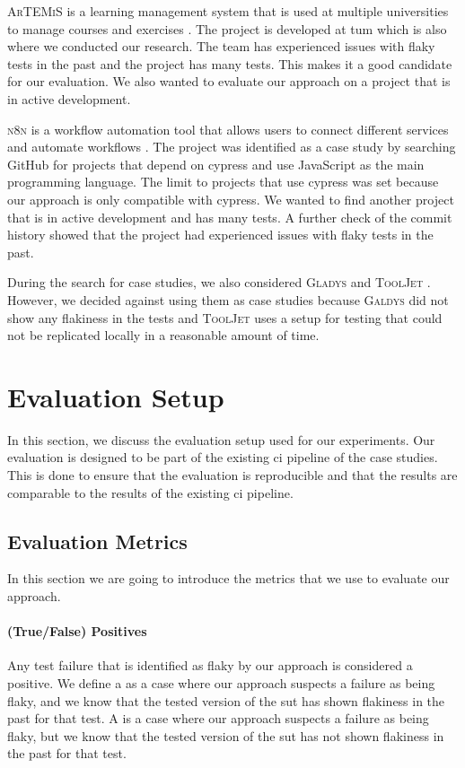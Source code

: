 \textsc{ArTEMiS} is a learning management system that is used at multiple universities to manage courses and exercises \autocite{krusche_artemis_2018}.
The project is developed at \ac{tum} which is also where we conducted our research.
The team has experienced issues with flaky tests in the past and the project has many tests.
This makes it a good candidate for our evaluation.
We also wanted to evaluate our approach on a project that is in active development.

\textsc{n8n} is a workflow automation tool that allows users to connect different services and automate workflows \autocite{noauthor_n8n_2023}.
The project was identified as a case study by searching GitHub for projects that depend on cypress and use JavaScript as the main programming language.
The limit to projects that use cypress was set because our approach is only compatible with cypress.
We wanted to find another project that is in active development and has many tests.
A further check of the commit history showed that the project had experienced issues with flaky tests in the past.

During the search for case studies, we also considered \textsc{Gladys} \autocite{noauthor_gladys_2023} and \textsc{ToolJet} \autocite{noauthor_tooljettooljet_2023}. However, we decided against using them as case studies because \textsc{Galdys} did not show any flakiness in the tests and \textsc{ToolJet} uses a setup for testing that could not be replicated locally in a reasonable amount of time.

\section{Evaluation Setup}
In this section, we discuss the evaluation setup used for our experiments.
Our evaluation is designed to be part of the existing \ac{ci} pipeline of the case studies.
This is done to ensure that the evaluation is reproducible and that the results are comparable to the results of the existing \ac{ci} pipeline.

\subsection{Evaluation Metrics}
In this section we are going to introduce the metrics that we use to evaluate our approach.

\paragraph{(True/False) Positives} Any test failure that is identified as flaky by our approach is considered a positive.
We define a  as a case where our approach suspects a failure as being flaky, and we know that the tested version of the \ac{sut} has shown flakiness in the past for that test.
A  is a case where our approach suspects a failure as being flaky, but we know that the tested version of the \ac{sut} has not shown flakiness in the past for that test.

